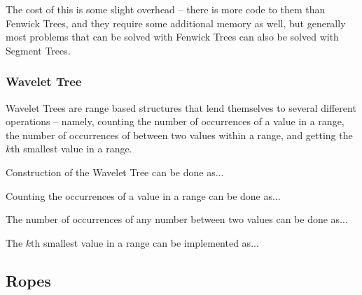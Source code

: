 The cost of this is some slight overhead -- there is more code to them than Fenwick Trees, and they require some additional memory as well, but generally most problems that can be solved with Fenwick Trees can also be solved with Segment Trees.

\subsubsection{Wavelet Tree}

Wavelet Trees are range based structures that lend themselves to several different operations -- namely, counting the number of occurrences of a value in a range, the number of occurrences of between two values within a range, and getting the $k$th smallest value in a range.

Construction of the Wavelet Tree can be done as...

Counting the occurrences of a value in a range can be done as...

The number of occurrences of any number between two values can be done as...

The $k$th smallest value in a range can be implemented as...

\subsection{Ropes}
